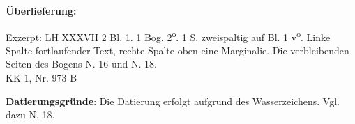       
               
                \begin{ledgroupsized}[r]{120mm}
                \footnotesize 
                \pstart                
                \noindent\textbf{\"{U}berlieferung:}   
                \pend
                \end{ledgroupsized}
            
              
                            \begin{ledgroupsized}[r]{114mm}
                            \footnotesize 
                            \pstart \parindent -6mm
                            Exzerpt: LH XXXVII 2 Bl. 1. 1 Bog. 2\textsuperscript{o}. 1 S. zweispaltig auf Bl. 1 v\textsuperscript{o}. Linke Spalte fortlaufender Text, rechte Spalte oben eine Marginalie. Die verbleibenden Seiten des Bogens N. 16 und N. 18.\\
                            KK 1, Nr. 973 B\pend
                            \end{ledgroupsized}
              
                            \begin{ledgroupsized}[r]{114mm}
                            \footnotesize 
                            \pstart \parindent -6mm
                            \makebox[6mm][l]{\textit{}} \pend
                            \end{ledgroupsized}
                \vspace*{5mm}
                \begin{ledgroup}
                \footnotesize 
                \pstart
            \noindent\footnotesize{\textbf{Datierungsgr\"{u}nde}: Die Datierung erfolgt aufgrund des Wasserzeichens. Vgl. dazu N. 18.}
                \pend
                \end{ledgroup}
            
